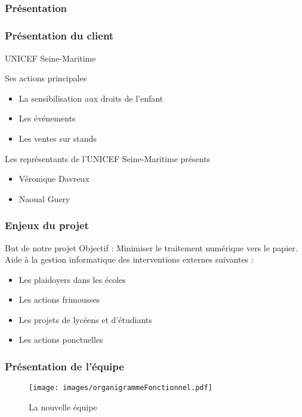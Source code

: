 \subsection{} %

\speaker{\Pierre}
\begin{frame}
\frametitle{Présentation}
	\frametitle{Présentation du client}
	\begin{center}
		UNICEF Seine-Maritime
	\end{center}

	\begin{block}{Ses actions principales}
		\begin{itemize}
			\item La sensibilisation aux droits de l'enfant
			\item Les événements 
			\item Les ventes sur stands
		\end{itemize}
	\end{block}

	\begin{block}{Les représentants de l'UNICEF Seine-Maritime présents}
		\begin{itemize}
			\item Véronique Davreux
			\item Naoual Guery
		\end{itemize}
	\end{block}
\end{frame}

\speaker{\Kafui}
\begin{frame}

\frametitle{Enjeux du projet}
	\begin{block}{But de notre projet}
		Objectif : Minimiser le traitement numérique vers le papier. \\
		Aide à la gestion informatique des interventions externes suivantes :
		\begin{itemize}
			\item Les plaidoyers dans les \'ecoles
			\item Les actions frimousses
			\item Les projets de lycéens et d'étudiants
			\item Les actions ponctuelles
		\end{itemize}
	\end{block}

\frametitle{Présentation de l'équipe}
	\begin{figure}[!h]
		\begin{center}
			\texttt{[image: images/organigrammeFonctionnel.pdf]}
			\caption{La nouvelle équipe}
		\end{center}
	\end{figure}

\end{frame}
